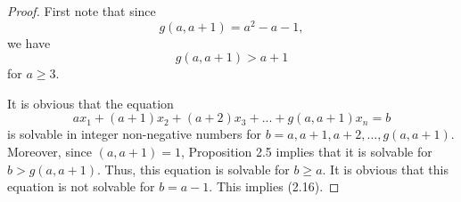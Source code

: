 \documentclass[10pt,a4paper]{amsart}
\begin{document}
\begin{proof}
First note that since 
\begin{equation}
g(a,a+1)=a^2-a-1,
\end{equation}
we have
\begin{equation}
g(a,a+1)>a+1
\end{equation}
for $a\geq 3$.

It is obvious that the equation 
\begin{equation}
ax_1+(a+1)x_2+(a+2)x_3+...+g(a,a+1)x_n=b
\end{equation}
is solvable in integer non-negative numbers for $b=a, a+1, a+2,...,g(a,a+1)$. Moreover, since $(a,a+1)=1$, Proposition 2.5 implies that it is solvable for $b>g(a,a+1)$. Thus, this equation is solvable for $b\geq a$. It is obvious that this equation is not solvable for $b=a-1$. This implies (2.16).
\end{proof}
\end{document}
